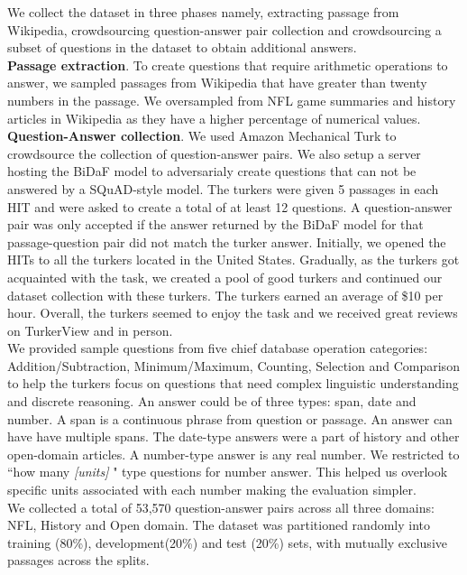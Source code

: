 
We collect the dataset in three phases namely, extracting passage from Wikipedia, crowdsourcing question-answer pair collection and crowdsourcing a subset of questions in the dataset to obtain additional answers. 
\\
\textbf{Passage extraction}. To create questions that require arithmetic operations to answer, we sampled passages from Wikipedia  that have greater than twenty numbers in the passage. We oversampled from NFL game summaries and history articles in Wikipedia as they have a higher percentage of numerical values. 
\\
\textbf{Question-Answer collection}. We used Amazon Mechanical Turk to crowdsource the collection of question-answer pairs. We also setup a server hosting the BiDaF model to adversarialy create questions that can not be answered by a SQuAD-style model. The turkers were given 5 passages in each HIT and were asked to create a total of at least 12 questions. A question-answer pair was only accepted if the answer returned by the BiDaF model for that passage-question pair did not match the turker answer. Initially, we opened the HITs to all the turkers located in the United States. Gradually, as the turkers got acquainted with the task, we created a pool of good turkers and continued our dataset collection with these turkers. The turkers earned an average of \$10 per hour. Overall, the turkers seemed to enjoy the task and we received great reviews on TurkerView and in person.
\\
We provided sample questions from five chief database operation categories: Addition/Subtraction, Minimum/Maximum, Counting, Selection and Comparison to help the turkers focus on questions that need complex linguistic understanding and discrete reasoning. An answer could be of three types: span, date and number. A span is a continuous phrase from question or passage. An answer can have have multiple spans. The date-type answers were a part of history and other open-domain articles. A number-type answer is any real number. We restricted to ``how many \textit{[units]} " type questions for number answer. This helped us overlook specific units associated with each number making the evaluation simpler.
\\
We collected a total of 53,570  question-answer pairs across all three domains: NFL, History and Open domain. The dataset was partitioned randomly into training (80\%), development(20\%) and test (20\%) sets, with mutually exclusive passages across the splits.



